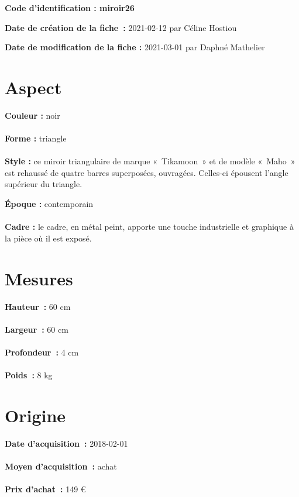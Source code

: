
     {\bf \huge Code d’identification : miroir26} \\
    \newline \hr \begin{center} 
       
    \end{center} 
    \begin{itemize}
    
    \footnotesize {\item {\bf Date de création de la fiche :} 2021-02-12
    {par Céline Hostiou}} 
    \footnotesize {\item {\bf Date de modification de la fiche :} 2021-03-01
    {par Daphné Mathelier} \\}
    \end{itemize}
   \hr 
    \section* {Aspect} 
    {\bf \large Couleur :} noir
    \\ \\ {\bf \large Forme :} triangle 
    \\ \\ {\bf \large Style :} 
            ce miroir triangulaire de marque « Tikamoon » et de modèle « Maho »
                est rehaussé de quatre barres superposées, ouvragées. Celles-ci épousent l’angle supérieur du triangle.
         
        {\bf \large Époque :} contemporain 
    \\ \\ {\bf \large Cadre :} le cadre, en métal peint, apporte une touche industrielle et graphique à la pièce où il est exposé. 
    \section* {Mesures}
     {\bf \large Hauteur :} 60 cm
   \\ \\ {\bf \large Largeur :} 60 cm 
   \\ \\ {\bf \large Profondeur :} 4 cm  
   \\ \\ {\bf \large Poids :} 8 kg
  
    \section* {Origine}
    {\bf \large Date d’acquisition :} 2018-02-01 \\ \\
    {\bf \large Moyen d’acquisition :} achat \\ \\ {\bf \large Prix d’achat :}
        149 € 
      

